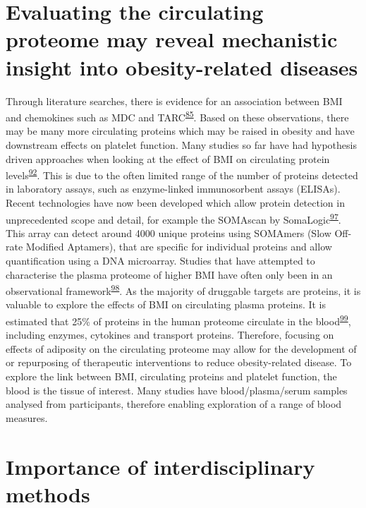 \documentclass[11pt,twoside]{bristolthesis}
\begin{document}
\hypertarget{evaluating-the-circulating-proteome-may-reveal-mechanistic-insight-into-obesity-related-diseases}{%
\section{Evaluating the circulating proteome may reveal mechanistic insight into obesity-related diseases}\label{evaluating-the-circulating-proteome-may-reveal-mechanistic-insight-into-obesity-related-diseases}}

Through literature searches, there is evidence for an association between BMI and chemokines such as MDC and TARC\textsuperscript{\protect\hyperlink{ref-Kitahara2014}{85}}. Based on these observations, there may be many more circulating proteins which may be raised in obesity and have downstream effects on platelet function. Many studies so far have had hypothesis driven approaches when looking at the effect of BMI on circulating protein levels\textsuperscript{\protect\hyperlink{ref-Timpson2011}{92}}. This is due to the often limited range of the number of proteins detected in laboratory assays, such as enzyme-linked immunosorbent assays (ELISAs). Recent technologies have now been developed which allow protein detection in unprecedented scope and detail, for example the SOMAscan by SomaLogic\textsuperscript{\protect\hyperlink{ref-Gold2012}{97}}. This array can detect around 4000 unique proteins using SOMAmers (Slow Off-rate Modified Aptamers), that are specific for individual proteins and allow quantification using a DNA microarray. Studies that have attempted to characterise the plasma proteome of higher BMI have often only been in an observational framework\textsuperscript{\protect\hyperlink{ref-Cominetti2018}{98}}. As the majority of druggable targets are proteins, it is valuable to explore the effects of BMI on circulating plasma proteins. It is estimated that 25\% of proteins in the human proteome circulate in the blood\textsuperscript{\protect\hyperlink{ref-Imming2006}{99}}, including enzymes, cytokines and transport proteins. Therefore, focusing on effects of adiposity on the circulating proteome may allow for the development of or repurposing of therapeutic interventions to reduce obesity-related disease. To explore the link between BMI, circulating proteins and platelet function, the blood is the tissue of interest. Many studies have blood/plasma/serum samples analysed from participants, therefore enabling exploration of a range of blood measures.

\hypertarget{importance-of-interdisciplinary-methods}{%
\section{Importance of interdisciplinary methods}\label{importance-of-interdisciplinary-methods}}
\end{document}

